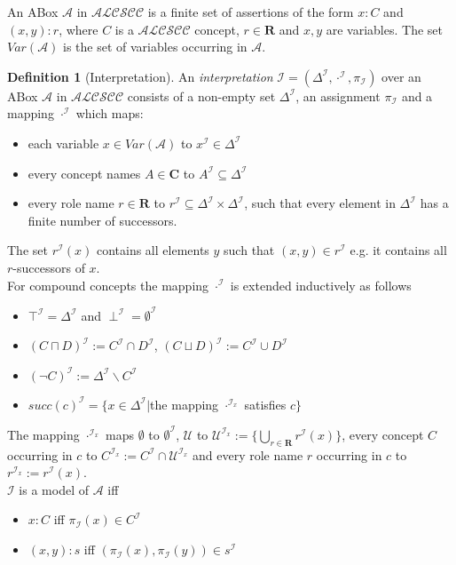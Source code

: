 \documentclass[a4paper,11pt]{scrartcl}
\theoremstyle{break}
\theoremstyle{definition}
\newtheorem{mydef}{Definition}
\begin{document}
An ABox $\mathcal{A}$ in $\mathcal{ALCSCC}$ is a finite set of assertions of the form $x:C$ and $(x,y):r$, where $C$ is a $\mathcal{ALCSCC}$ concept, $r\in\mathbf{R}$ and $x,y$ are variables. The set $Var(\mathcal{A})$ is the set of variables occurring in $\mathcal{A}$. 
\begin{mydef}[Interpretation]
An \textit{interpretation} $\mathcal{I}=(\Delta^\mathcal{I},\cdot^\mathcal{I},\pi_\mathcal{I})$ over an ABox $\mathcal{A}$ in $\mathcal{ALCSCC}$ consists of a non-empty set $\Delta^\mathcal{I}$, an assignment $\pi_\mathcal{I}$ and a mapping $\cdot^\mathcal{I}$ which maps:
\begin{itemize}
\item each variable $x\in Var(\mathcal{A})$ to $x^\mathcal{I}\in \Delta^\mathcal{I}$
\item every concept names $A\in\mathbf{C}$ to $A^\mathcal{I}\subseteq \Delta^\mathcal{I}$
\item every role name $r\in\mathbf{R}$ to $r^\mathcal{I}\subseteq\Delta^\mathcal{I}\times\Delta^\mathcal{I}$, such that every element in $\Delta^\mathcal{I}$ has a finite number of successors.
\end{itemize}
The set $r^\mathcal{I}(x)$ contains all elements $y$ such that $(x,y)\in r^\mathcal{I}$ e.g. it contains all $r$-successors of $x$.\\
For compound concepts the mapping $\cdot^\mathcal{I}$ is extended inductively as follows
\begin{itemize}
\item $\top^\mathcal{I}=\Delta^\mathcal{I}$ and $\perp^\mathcal{I}=\emptyset^\mathcal{I}$
\item $(C\sqcap D)^\mathcal{I}:=C^\mathcal{I}\cap D^\mathcal{I}$, $(C\sqcup D)^\mathcal{I}:=C^\mathcal{I}\cup D^\mathcal{I}$
\item $(\neg C)^\mathcal{I}:=\Delta^\mathcal{I}\backslash C^\mathcal{I}$
\item $succ(c)^\mathcal{I}=\{x\in \Delta^\mathcal{I}|$the mapping $\cdot^{\mathcal{I}_x}$ satisfies $c\}$
\end{itemize}
The mapping $\cdot^{\mathcal{I}_x}$ maps $\emptyset$ to $\emptyset^\mathcal{I}$, $\mathcal{U}$ to $\mathcal{U}^{\mathcal{I}_x}:=\{\bigcup_{r\in\mathbf{R}}r^\mathcal{I}(x)\}$, every concept $C$ occurring in $c$ to $C^{\mathcal{I}_x}:=C^\mathcal{I}\cap \mathcal{U}^{\mathcal{I}_x}$ and every role name $r$ occurring in $c$ to $r^{\mathcal{I}_x}:=r^\mathcal{I}(x)$.\\
$\mathcal{I}$ is a model of $\mathcal{A}$ iff
\begin{itemize}
\item $x:C$ iff $\pi_\mathcal{I}(x)\in C^\mathcal{I}$ 
\item $(x,y):s$ iff $(\pi_\mathcal{I}(x),\pi_\mathcal{I}(y))\in s^\mathcal{I}$
\end{itemize} 
\end{mydef}
\end{document}
